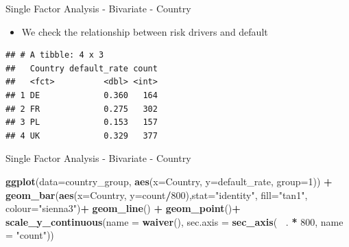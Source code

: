 \documentclass[9pt,ignorenonframetext,]{beamer}
\newenvironment{Shaded}{\begin{snugshade}}{\end{snugshade}}
\newcommand{\KeywordTok}[1]{\textcolor[rgb]{0.13,0.29,0.53}{\textbf{#1}}}
\newcommand{\DataTypeTok}[1]{\textcolor[rgb]{0.13,0.29,0.53}{#1}}
\newcommand{\DecValTok}[1]{\textcolor[rgb]{0.00,0.00,0.81}{#1}}
\newcommand{\StringTok}[1]{\textcolor[rgb]{0.31,0.60,0.02}{#1}}
\newcommand{\OtherTok}[1]{\textcolor[rgb]{0.56,0.35,0.01}{#1}}
\newcommand{\OperatorTok}[1]{\textcolor[rgb]{0.81,0.36,0.00}{\textbf{#1}}}
\newcommand{\NormalTok}[1]{#1}
\providecommand{\tightlist}{%
  \setlength{\itemsep}{0pt}\setlength{\parskip}{0pt}}
\begin{document}
\begin{frame}[fragile]{Single Factor Analysis - Bivariate - Country}

\begin{itemize}
\tightlist
\item
  We check the relationship between risk drivers and default
\end{itemize}

\begin{Shaded}
\end{Shaded}

\begin{verbatim}
## # A tibble: 4 x 3
##   Country default_rate count
##   <fct>          <dbl> <int>
## 1 DE             0.360   164
## 2 FR             0.275   302
## 3 PL             0.153   157
## 4 UK             0.329   377
\end{verbatim}

\end{frame}

\begin{frame}[fragile]{Single Factor Analysis - Bivariate - Country}

\begin{Shaded}
\begin{Highlighting}[]
\KeywordTok{ggplot}\NormalTok{(}\DataTypeTok{data=}\NormalTok{country_group, }\KeywordTok{aes}\NormalTok{(}\DataTypeTok{x=}\NormalTok{Country, }\DataTypeTok{y=}\NormalTok{default_rate,}
                               \DataTypeTok{group=}\DecValTok{1}\NormalTok{)) }\OperatorTok{+}
\StringTok{    }\KeywordTok{geom_bar}\NormalTok{(}\KeywordTok{aes}\NormalTok{(}\DataTypeTok{x=}\NormalTok{Country, }\DataTypeTok{y=}\NormalTok{count}\OperatorTok{/}\DecValTok{800}\NormalTok{),}\DataTypeTok{stat=}\StringTok{"identity"}\NormalTok{,}
             \DataTypeTok{fill=}\StringTok{"tan1"}\NormalTok{, }\DataTypeTok{colour=}\StringTok{"sienna3"}\NormalTok{)}\OperatorTok{+}
\StringTok{    }\KeywordTok{geom_line}\NormalTok{() }\OperatorTok{+}
\StringTok{    }\KeywordTok{geom_point}\NormalTok{()}\OperatorTok{+}
\StringTok{    }\KeywordTok{scale_y_continuous}\NormalTok{(}\DataTypeTok{name =} \KeywordTok{waiver}\NormalTok{(),}
                       \DataTypeTok{sec.axis =} \KeywordTok{sec_axis}\NormalTok{(}\OperatorTok{~}\StringTok{ }\NormalTok{. }\OperatorTok{*}\StringTok{ }\DecValTok{800}\NormalTok{,}
                                           \DataTypeTok{name =} \StringTok{"count"}\NormalTok{))}
\end{Highlighting}
\end{Shaded}

\end{frame}
\end{document}
